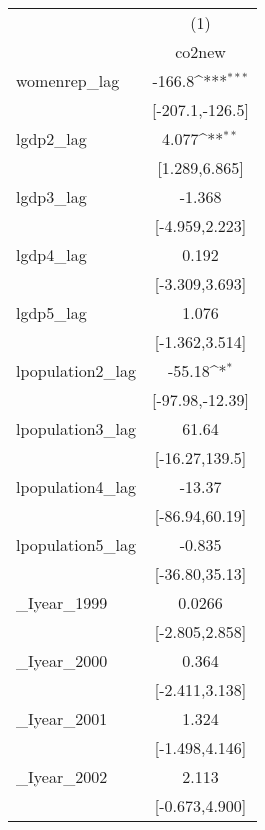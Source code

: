 {
\def\sym#1{\ifmmode^{#1}\else\(^{#1}\)\fi}
\begin{tabular}{l*{1}{c}}
\hline\hline
            &\multicolumn{1}{c}{(1)}        \\
            &\multicolumn{1}{c}{co2new}     \\
\hline
womenrep\_lag&                -166.8\sym{***}\\
            &       [-207.1,-126.5]         \\
[1em]
lgdp2\_lag   &                 4.077\sym{**} \\
            &         [1.289,6.865]         \\
[1em]
lgdp3\_lag   &                -1.368         \\
            &        [-4.959,2.223]         \\
[1em]
lgdp4\_lag   &                 0.192         \\
            &        [-3.309,3.693]         \\
[1em]
lgdp5\_lag   &                 1.076         \\
            &        [-1.362,3.514]         \\
[1em]
lpopulation2\_lag&                -55.18\sym{*}  \\
            &       [-97.98,-12.39]         \\
[1em]
lpopulation3\_lag&                 61.64         \\
            &        [-16.27,139.5]         \\
[1em]
lpopulation4\_lag&                -13.37         \\
            &        [-86.94,60.19]         \\
[1em]
lpopulation5\_lag&                -0.835         \\
            &        [-36.80,35.13]         \\
[1em]
\_Iyear\_1999 &                0.0266         \\
            &        [-2.805,2.858]         \\
[1em]
\_Iyear\_2000 &                 0.364         \\
            &        [-2.411,3.138]         \\
[1em]
\_Iyear\_2001 &                 1.324         \\
            &        [-1.498,4.146]         \\
[1em]
\_Iyear\_2002 &                 2.113         \\
            &        [-0.673,4.900]         \\

\end{tabular}}
